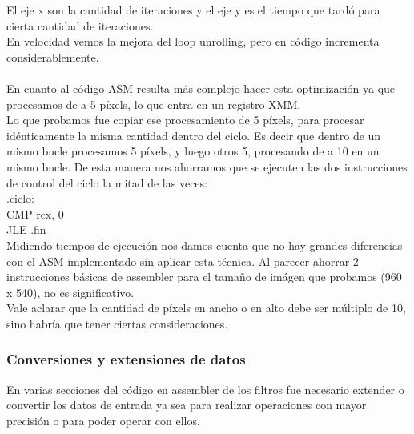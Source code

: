 El eje x son la cantidad de iteraciones y el eje y es el tiempo que tard\'o para cierta cantidad de iteraciones.\\
En velocidad vemos la mejora del loop unrolling, pero en c\'odigo incrementa considerablemente.\\\\

En cuanto al c\'odigo ASM resulta m\'as complejo hacer esta optimizaci\'on ya que procesamos de a 5 p\'ixels, lo que entra en un registro XMM.\\
Lo que probamos fue copiar ese procesamiento de 5 p\'ixels, para procesar id\'enticamente la misma cantidad dentro del ciclo. Es decir que dentro de un mismo bucle procesamos 5 p\'ixels, y luego otros 5, procesando de a 10 en un mismo bucle. De esta manera nos ahorramos que se ejecuten las dos instrucciones de control del ciclo la mitad de las veces:\\

.ciclo:\\
CMP rcx, 0\\
JLE .fin\\

Midiendo tiempos de ejecuci\'on nos damos cuenta que no hay grandes diferencias con el ASM implementado sin aplicar esta t\'ecnica. Al parecer ahorrar 2 instrucciones b\'asicas de assembler para el tamaño de im\'agen que probamos (960 x 540), no es significativo.\\
Vale aclarar que la cantidad de p\'ixels en ancho o en alto debe ser m\'ultiplo de 10, sino habr\'ia que tener ciertas consideraciones.

\subsubsection{Conversiones y extensiones de datos}
En varias secciones del c\'odigo en assembler de los filtros fue necesario extender o convertir los datos de entrada ya sea para realizar operaciones con
mayor precisi\'on o para poder operar con ellos.\newline

